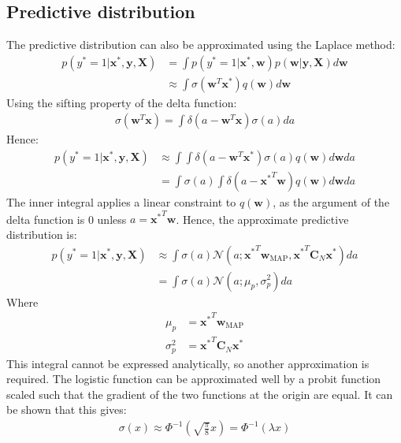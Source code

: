 \documentclass[a4paper]{article}
\begin{document}
    \subsection{Predictive distribution}
    The predictive distribution can also be approximated using the Laplace method:
    \begin{align}
        p(y^* = 1 | \bm{x}^*, \bm{y}, \bm{X}) &= \int p(y^* = 1 | \bm{x}^*, \bm{w}) p(\bm{w} | \bm{y}, \bm{X}) d\bm{w} \nonumber \\
        & \approx \int \sigma(\bm{w}^T\bm{x}^*) q(\bm{w}) d\bm{w}
    \end{align}
    Using the sifting property of the delta function:
    \begin{align}
        \sigma(\bm{w}^T \bm{x}) = \int \delta(a - \bm{w}^T \bm{x}) \sigma(a) da
    \end{align}
    Hence:
     \begin{align}
        p(y^* = 1 | \bm{x}^*, \bm{y}, \bm{X}) &\approx \int \int \delta(a - \bm{w}^T \bm{x}^*) \sigma(a) q(\bm{w}) d\bm{w} da \nonumber \\
         &= \int \sigma(a) \int \delta(a - {\bm{x}^*}^T \bm{w}) q(\bm{w}) d\bm{w} da \nonumber
    \end{align}
    The inner integral applies a linear constraint to $q(\bm{w})$, as the argument of the delta function is 0 unless $a = {\bm{x}^*}^T \bm{w}$.
    Hence, the approximate predictive distribution is:
    \begin{align}
        \label{eq:approx_predictive}
         p(y^* = 1 | \bm{x}^*, \bm{y}, \bm{X}) &\approx \int \sigma(a) \mathcal{N}(a; {\bm{x}^*}^T \bm{w}_\text{MAP}, {\bm{x}^*}^T \bm{C}_N \bm{x^*}) da \nonumber \\
        &= \int \sigma(a) \mathcal{N}(a; \mu_p, \sigma_p^2) da
     \end{align}
    Where
    \begin{align}
        \mu_p &= {\bm{x}^*}^T \bm{w}_\text{MAP}\\
        \sigma_p^2 &= {\bm{x}^*}^T \bm{C}_N \bm{x^*}
    \end{align}
    This integral cannot be expressed analytically, so another approximation is required.
    The logistic function can be approximated well by a probit function scaled such that the gradient of the two functions at the origin are equal.
    It can be shown that this gives:
    \begin{align}
        \label{eq:probit_approx}
        \sigma(x) \approx \Phi^{-1}\left(\sqrt{\frac{\pi}{8}} x\right) = \Phi^{-1}(\lambda x)
    \end{align}
\end{document}
